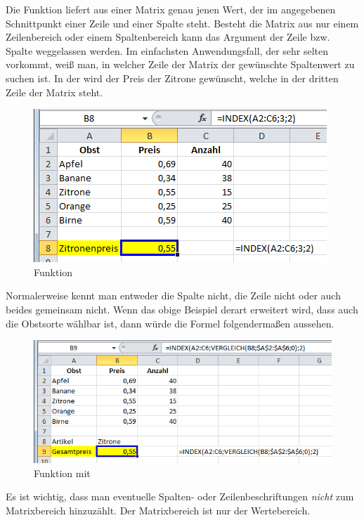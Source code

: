 Die  Funktion liefert aus einer Matrix genau jenen Wert, der im angegebenen Schnittpunkt einer Zeile und einer Spalte steht. Besteht die Matrix aus nur einem Zeilenbereich oder einem Spaltenbereich kann das Argument der Zeile bzw. Spalte weggelassen werden. 
%
Im einfachsten Anwendungsfall, der sehr selten vorkommt, weiß man, in welcher Zeile der Matrix der gewünschte Spaltenwert zu suchen ist. In der   wird der Preis der Zitrone gewünscht, welche in der dritten Zeile der Matrix steht.
	\begin{figure}[H]
		\centering
			\includegraphics[scale=0.7]{images/matrix_1b}
		\caption{ Funktion}
		\label{fig:matrix}
	\end{figure}
%
Normalerweise kennt man entweder die Spalte nicht, die Zeile nicht oder auch beides gemeinsam nicht. Wenn das obige Beispiel derart erweitert wird, dass auch die Obstsorte wählbar ist, dann würde die Formel folgendermaßen aussehen.
%
	\begin{figure}[H]
		\centering
			\includegraphics[scale=0.7]{images/matrix_mit_vergleich_b}
		\caption{ Funktion mit }
		\label{fig:matrix_mit_vergleich}
	\end{figure}
%
\begin{infobox}%
Es ist wichtig, dass man eventuelle Spalten- oder Zeilenbeschriftungen \textit{nicht} zum Matrixbereich hinzuzählt. Der Matrixbereich ist nur der Wertebereich.
\end{infobox}

